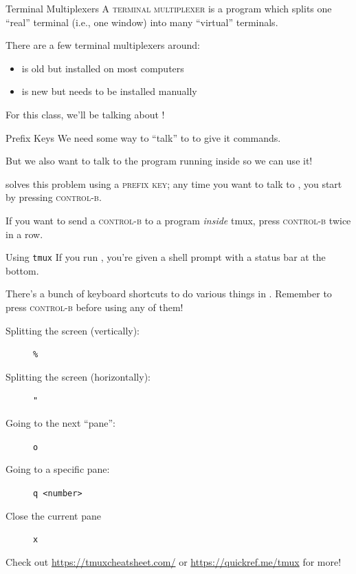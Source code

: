 \begin{frame}{Terminal Multiplexers}
  A \textsc{terminal multiplexer} is a program which splits one \enquote{real}
  terminal (i.e., one window) into many \enquote{virtual} terminals.
  \pause

  There are a few terminal multiplexers around:
  \pause
  \begin{itemize}
    \item
       is old but installed on most computers
      \pause
    \item
       is new but needs to be installed manually
  \end{itemize}
  \pause

  For this class, we'll be talking about !
\end{frame}

\begin{frame}{Prefix Keys}
  We need some way to \enquote{talk} to  to give it commands.
  \pause

  But we also want to talk to the program running inside  so we can
  use it!
  \pause

   solves this problem using a \textsc{prefix key}; any time you want
  to talk to , you start by pressing \textsc{control-b}.
  \pause

  If you want to send a \textsc{control-b} to a program \textit{inside} tmux,
  press \textsc{control-b} twice in a row.
\end{frame}

\begin{frame}{Using \texttt{tmux}}
  If you run , you're given a shell prompt with a status bar at the
  bottom.

  There's a bunch of keyboard shortcuts to do various things in .
  Remember to press \textsc{control-b} before using any of them!

  \begin{description}
    \item[Splitting the screen (vertically):] \texttt{\%}
    \item[Splitting the screen (horizontally):] \texttt{"}
    \item[Going to the next \enquote{pane}:] \texttt{o}
    \item[Going to a specific pane:] \texttt{q <number>}
    \item[Close the current pane] \texttt{x}
  \end{description}

  Check out \url{https://tmuxcheatsheet.com/} or \url{https://quickref.me/tmux}
  for more!
\end{frame}

